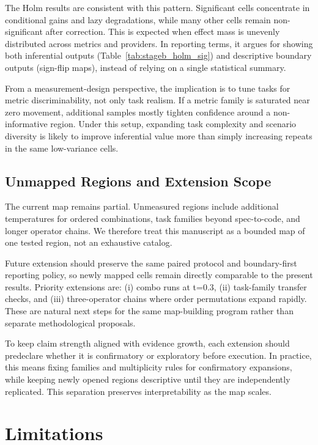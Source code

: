 \documentclass[11pt,a4paper]{article}
\begin{document}
The Holm results are consistent with this pattern. Significant cells concentrate in conditional gains and lazy degradations, while many other cells remain non-significant after correction. This is expected when effect mass is unevenly distributed across metrics and providers. In reporting terms, it argues for showing both inferential outputs (Table~\ref{tab:stageb_holm_sig}) and descriptive boundary outputs (sign-flip maps), instead of relying on a single statistical summary.

From a measurement-design perspective, the implication is to tune tasks for metric discriminability, not only task realism. If a metric family is saturated near zero movement, additional samples mostly tighten confidence around a non-informative region. Under this setup, expanding task complexity and scenario diversity is likely to improve inferential value more than simply increasing repeats in the same low-variance cells.

\subsection{Unmapped Regions and Extension Scope}

The current map remains partial. Unmeasured regions include additional temperatures for ordered combinations, task families beyond spec-to-code, and longer operator chains. We therefore treat this manuscript as a bounded map of one tested region, not an exhaustive catalog.

Future extension should preserve the same paired protocol and boundary-first reporting policy, so newly mapped cells remain directly comparable to the present results. Priority extensions are: (i) combo runs at t=0.3, (ii) task-family transfer checks, and (iii) three-operator chains where order permutations expand rapidly. These are natural next steps for the same map-building program rather than separate methodological proposals.

To keep claim strength aligned with evidence growth, each extension should predeclare whether it is confirmatory or exploratory before execution. In practice, this means fixing families and multiplicity rules for confirmatory expansions, while keeping newly opened regions descriptive until they are independently replicated. This separation preserves interpretability as the map scales.

\section{Limitations}
\label{sec:limitations}
\end{document}
